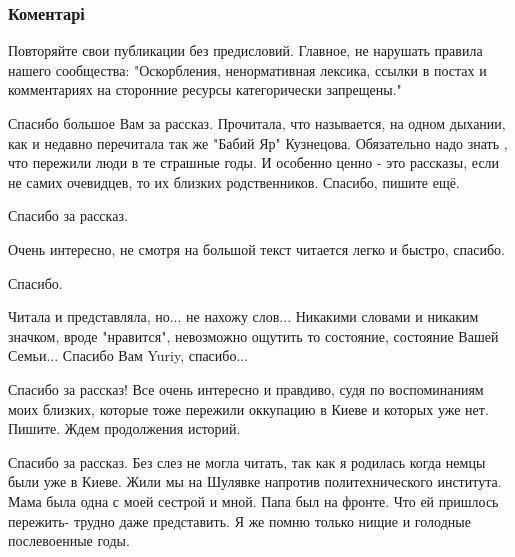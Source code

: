  
 
 
 
 
\subsubsection{Коментарі}
\label{sec:04_11_2021.fb.fb_group.story_kiev_ua.1.semja_kiev_okupacia.cmt}

\begin{itemize} %

Повторяйте свои публикации без предисловий. Главное, не нарушать правила нашего
сообщества: "Оскорбления, ненормативная лексика, ссылки в постах и комментариях
на сторонние ресурсы категорически запрещены."


Спасибо большое Вам за рассказ. Прочитала, что называется, на одном дыхании,
как и недавно перечитала так же "Бабий Яр" Кузнецова. Обязательно надо знать ,
что пережили люди в те страшные годы. И особенно ценно - это рассказы, если не
самих очевидцев, то их близких родственников. Спасибо, пишите ещё.

Спасибо за рассказ.

Очень интересно, не смотря на большой текст читается легко и быстро, спасибо.

Спасибо.


Читала и представляла, но... не нахожу слов... Никакими словами и никаким
значком, вроде "нравится", невозможно ощутить то состояние, состояние Вашей
Семьи... Спасибо Вам Yuriy, спасибо...


Спасибо за рассказ! Все очень интересно и правдиво, судя по воспоминаниям моих
близких, которые тоже пережили оккупацию в Киеве и которых уже нет. Пишите.
Ждем продолжения историй.


Спасибо за рассказ. Без слез не могла читать, так как я родилась когда немцы
были уже в Киеве. Жили мы на Шулявке напротив политехнического института. Мама
была одна с моей сестрой и мной. Папа был на фронте. Что ей пришлось пережить-
трудно даже представить. Я же помню только нищие и голодные послевоенные годы.



\end{itemize}

